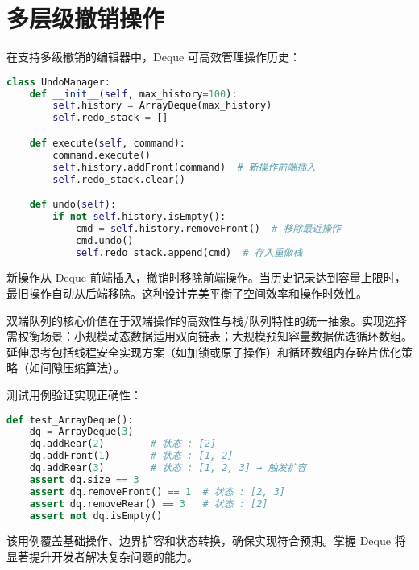 \section{多层级撤销操作}
在支持多级撤销的编辑器中，Deque 可高效管理操作历史：\par
\begin{lstlisting}[language=python]
class UndoManager:
    def __init__(self, max_history=100):
        self.history = ArrayDeque(max_history)
        self.redo_stack = []

    def execute(self, command):
        command.execute()
        self.history.addFront(command)  # 新操作前端插入
        self.redo_stack.clear()

    def undo(self):
        if not self.history.isEmpty():
            cmd = self.history.removeFront()  # 移除最近操作
            cmd.undo()
            self.redo_stack.append(cmd)  # 存入重做栈
\end{lstlisting}
新操作从 Deque 前端插入，撤销时移除前端操作。当历史记录达到容量上限时，最旧操作自动从后端移除。这种设计完美平衡了空间效率和操作时效性。\par
双端队列的核心价值在于双端操作的高效性与栈/队列特性的统一抽象。实现选择需权衡场景：小规模动态数据适用双向链表；大规模预知容量数据优选循环数组。延伸思考包括线程安全实现方案（如加锁或原子操作）和循环数组内存碎片优化策略（如间隙压缩算法）。\par
测试用例验证实现正确性：\par
\begin{lstlisting}[language=python]
def test_ArrayDeque():
    dq = ArrayDeque(3)
    dq.addRear(2)        # 状态 : [2]
    dq.addFront(1)       # 状态 : [1, 2]
    dq.addRear(3)        # 状态 : [1, 2, 3] → 触发扩容
    assert dq.size == 3
    assert dq.removeFront() == 1  # 状态 : [2, 3]
    assert dq.removeRear() == 3   # 状态 : [2]
    assert not dq.isEmpty()
\end{lstlisting}
该用例覆盖基础操作、边界扩容和状态转换，确保实现符合预期。掌握 Deque 将显著提升开发者解决复杂问题的能力。\par
